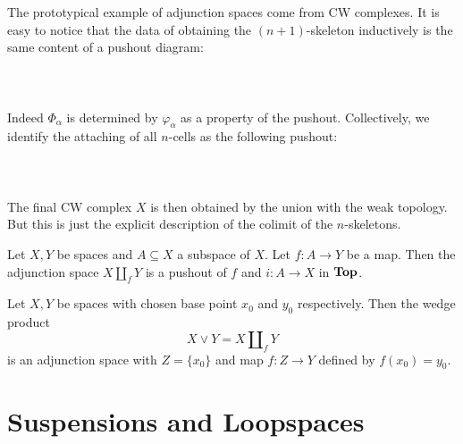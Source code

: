 \documentclass[a4paper]{article}
\begin{document}
The prototypical example of adjunction spaces come from CW complexes. It is easy to notice that the data of obtaining the $(n+1)$-skeleton inductively is the same content of a pushout diagram: \\~\\
\\~\\
Indeed $\Phi_\alpha$ is determined by $\varphi_\alpha$ as a property of the pushout. Collectively, we identify the attaching of all $n$-cells as the following pushout: \\~\\
\\~\\

The final CW complex $X$ is then obtained by the union with the weak topology. But this is just the explicit description of the colimit of the $n$-skeletons. 

\begin{prp}{}{} Let $X,Y$ be spaces and $A\subseteq X$ a subspace of $X$. Let $f:A\to Y$ be a map. Then the adjunction space $X\amalg_f Y$ is a pushout of $f$ and $i:A\to X$ in $\bold{Top}$. 
\end{prp}

\begin{prp}{}{} Let $X,Y$ be spaces with chosen base point $x_0$ and $y_0$ respectively. Then the wedge product $$X\vee Y=X\amalg_fY$$ is an adjunction space with $Z=\{x_0\}$ and map $f:Z\to Y$ defined by $f(x_0)=y_0$. 
\end{prp}

\pagebreak
\section{Suspensions and Loopspaces}
\end{document}
